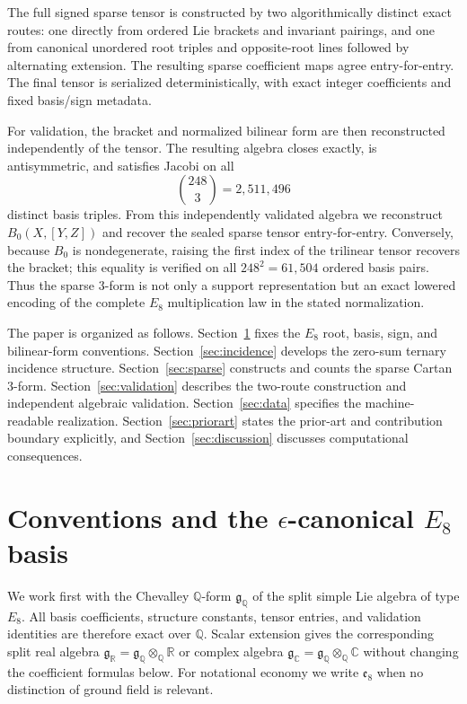\documentclass[11pt]{article}
\theoremstyle{definition}
\theoremstyle{remark}
\begin{document}
The full signed sparse tensor is constructed by two algorithmically distinct exact routes: one directly from ordered Lie brackets and invariant pairings, and one from canonical unordered root triples and opposite-root lines followed by alternating extension.  The resulting sparse coefficient maps agree entry-for-entry.  The final tensor is serialized deterministically, with exact integer coefficients and fixed basis/sign metadata.

For validation, the bracket and normalized bilinear form are then reconstructed independently of the tensor.  The resulting algebra closes exactly, is antisymmetric, and satisfies Jacobi on all
\[
\binom{248}{3}=2{,}511{,}496
\]
distinct basis triples.  From this independently validated algebra we reconstruct $B_0(X,[Y,Z])$ and recover the sealed sparse tensor entry-for-entry.  Conversely, because $B_0$ is nondegenerate, raising the first index of the trilinear tensor recovers the bracket; this equality is verified on all $248^2=61{,}504$ ordered basis pairs.  Thus the sparse $3$-form is not only a support representation but an exact lowered encoding of the complete $E_8$ multiplication law in the stated normalization.

The paper is organized as follows.  Section~\ref{sec:conventions} fixes the $E_8$ root, basis, sign, and bilinear-form conventions.  Section~\ref{sec:incidence} develops the zero-sum ternary incidence structure.  Section~\ref{sec:sparse} constructs and counts the sparse Cartan 3-form.  Section~\ref{sec:validation} describes the two-route construction and independent algebraic validation.  Section~\ref{sec:data} specifies the machine-readable realization.  Section~\ref{sec:priorart} states the prior-art and contribution boundary explicitly, and Section~\ref{sec:discussion} discusses computational consequences.

\section{Conventions and the \texorpdfstring{$\epsilon$-canonical $E_8$}{epsilon-canonical E8} basis}\label{sec:conventions}

We work first with the Chevalley $\mathbb Q$-form $\mathfrak g_{\mathbb Q}$ of the split simple Lie algebra of type $E_8$.  All basis coefficients, structure constants, tensor entries, and validation identities are therefore exact over $\mathbb Q$.  Scalar extension gives the corresponding split real algebra $\mathfrak g_{\mathbb R}=\mathfrak g_{\mathbb Q}\otimes_{\mathbb Q}\mathbb R$ or complex algebra $\mathfrak g_{\mathbb C}=\mathfrak g_{\mathbb Q}\otimes_{\mathbb Q}\mathbb C$ without changing the coefficient formulas below.  For notational economy we write $\mathfrak e_8$ when no distinction of ground field is relevant.
\end{document}
